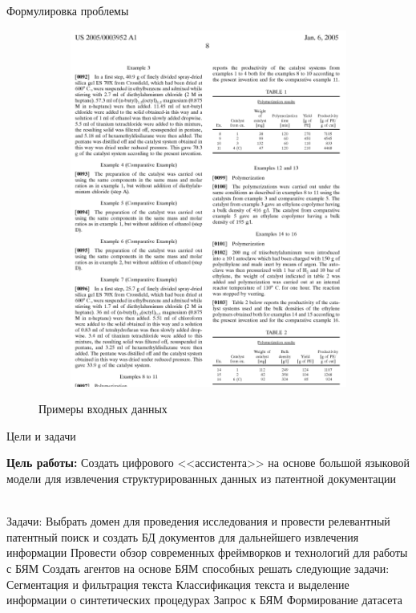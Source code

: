 \documentclass{beamer}
\begin{document}
\begin{frame}{Формулировка проблемы}
\begin{figure}[!tbp]
\begin{subfigure}[b]{0.4\textwidth}
		\includegraphics[width=1\linewidth]{images/patent_data_example_2}
			\caption{}
			\label{fig:patent_data_example_2}
		\end{subfigure}
		\caption{Примеры входных данных}
	\end{figure}

	\end{frame}

	\begin{frame}{Цели и задачи}

	 	\textbf{Цель работы:} Создать цифрового <<ассистента>> на основе большой языковой модели для извлечения структурированных данных из патентной документации\\~\
	 	\begin{outline}

	 	 Задачи:
	 		\1 Выбрать домен для проведения исследования и провести релевантный патентный поиск и создать БД документов для дальнейшего извлечения информации
	 		\1 Провести обзор современных фреймворков и технологий для работы с БЯМ 
	 		\1 Создать агентов на основе БЯМ способных решать следующие задачи:
	 		\2 Сегментация и фильтрация текста
	 		\2 Классификация текста и выделение информации о синтетических процедурах
	 		\2 Запрос к БЯМ
	 		\2 Формирование датасета
 		\end{outline}
	\end{frame}
	
\end{document}
